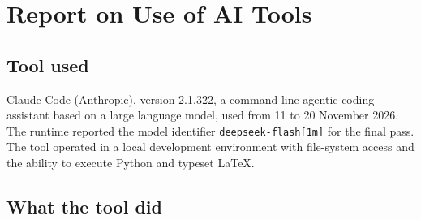 \section*{Report on Use of AI Tools}

\subsection*{Tool used}

Claude Code (Anthropic), version 2.1.322, a command-line agentic coding assistant
based on a large language model, used from 11 to 20 November 2026. The runtime
reported the model identifier \texttt{deepseek-flash[1m]} for the final pass. The tool
operated in a local development environment with file-system access and the ability
to execute Python and typeset \LaTeX{}.

\subsection*{What the tool did}

